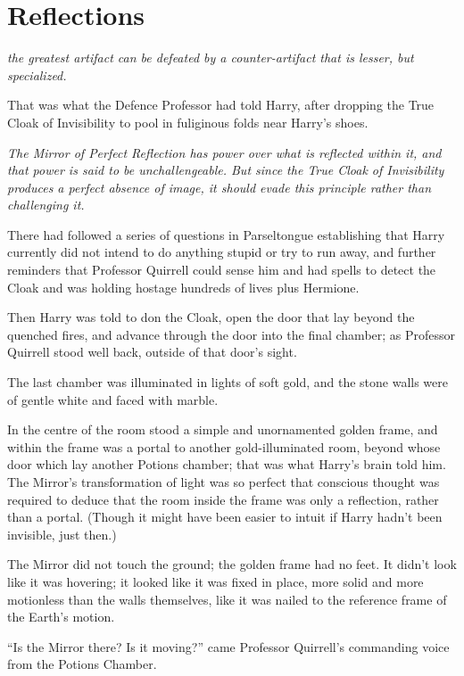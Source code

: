 \chapter{Reflections}

 \emph{the
greatest artifact can be defeated by a counter-artifact that is lesser, but specialized.}

That was what the Defence Professor had told Harry, after dropping the True Cloak of Invisibility to pool in fuliginous folds near Harry’s shoes.

\emph{The Mirror of Perfect Reflection has power over what is reflected within it, and that power is said to be unchallengeable. But since the True Cloak of Invisibility produces a perfect absence of image, it should evade this principle rather than challenging it.}

There had followed a series of questions in Parseltongue establishing that Harry currently did not intend to do anything stupid or try to run away, and further reminders that Professor Quirrell could sense him and had spells to detect the Cloak and was holding hostage hundreds of lives plus Hermione.

Then Harry was told to don the Cloak, open the door that lay beyond the quenched fires, and advance through the door into the final chamber; as Professor Quirrell stood well back, outside of that door’s sight.

The last chamber was illuminated in lights of soft gold, and the stone walls were of gentle white and faced with marble.

In the centre of the room stood a simple and unornamented golden frame, and within the frame was a portal to another gold-illuminated room, beyond whose door which lay another Potions chamber; that was what Harry’s brain told him. The Mirror’s transformation of light was so perfect that conscious thought was required to deduce that the room inside the frame was only a reflection, rather than a portal. (Though it might have been easier to intuit if Harry hadn’t been invisible, just then.)

The Mirror did not touch the ground; the golden frame had no feet. It didn’t look like it was hovering; it looked like it was fixed in place, more solid and more motionless than the walls themselves, like it was nailed to the reference frame of the Earth’s motion.

“Is the Mirror there? Is it moving?” came Professor Quirrell’s commanding voice from the Potions Chamber.

